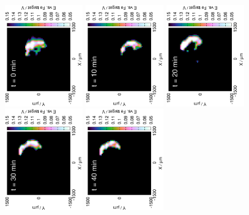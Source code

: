 \documentclass[3p]{elsarticle}
\begin{document}
\begin{figure}[H]
\centering
\includegraphics[trim = 20mm 30mm 0mm 20mm, clip, width=0.3\textwidth, angle=-90]{18011710.eps} 
\includegraphics[trim = 20mm 30mm 0mm 20mm, clip, width=0.3\textwidth, angle=-90]{18011711.eps}
\includegraphics[trim = 20mm 30mm 0mm 20mm, clip, width=0.3\textwidth, angle=-90]{18011712.eps} 
\includegraphics[trim = 20mm 30mm 0mm 20mm, clip, width=0.3\textwidth, angle=-90]{18011713.eps}
\includegraphics[trim = 20mm 30mm 0mm 20mm, clip, width=0.3\textwidth, angle=-90]{18011714.eps} 

\end{figure}
\end{document}
